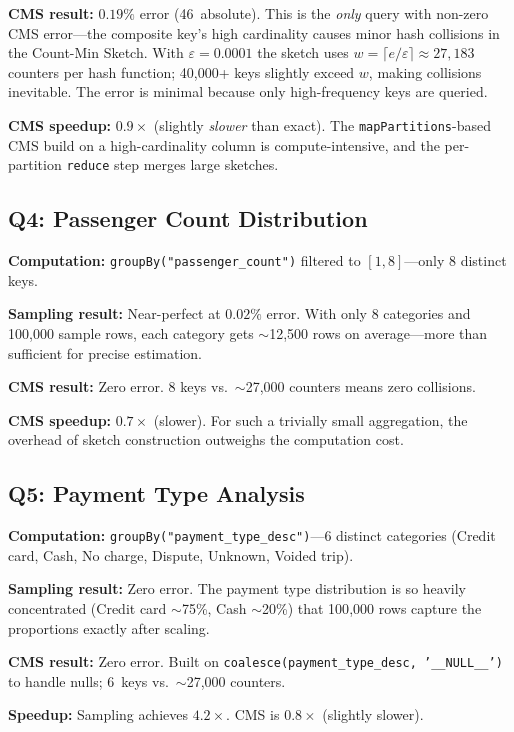 \documentclass{article}
\begin{document}
\textbf{CMS result:} $0.19\%$ error (46~absolute). This is the \emph{only} query with non-zero CMS error—the composite key's high cardinality causes minor hash collisions in the Count-Min Sketch. With $\varepsilon = 0.0001$ the sketch uses $w = \lceil e / \varepsilon \rceil \approx 27{,}183$ counters per hash function; 40{,}000+ keys slightly exceed $w$, making collisions inevitable. The error is minimal because only high-frequency keys are queried.

\textbf{CMS speedup:} $0.9\times$ (slightly \emph{slower} than exact). The \texttt{mapPartitions}-based CMS build on a high-cardinality column is compute-intensive, and the per-partition \texttt{reduce} step merges large sketches.

\subsection{Q4: Passenger Count Distribution}

\textbf{Computation:} \texttt{groupBy("passenger\_count")} filtered to $[1, 8]$—only 8 distinct keys.

\textbf{Sampling result:} Near-perfect at $0.02\%$ error. With only 8 categories and 100{,}000 sample rows, each category gets $\sim$12{,}500 rows on average—more than sufficient for precise estimation.

\textbf{CMS result:} Zero error. 8 keys vs.\ $\sim$27{,}000 counters means zero collisions.

\textbf{CMS speedup:} $0.7\times$ (slower). For such a trivially small aggregation, the overhead of sketch construction outweighs the computation cost.

\subsection{Q5: Payment Type Analysis}

\textbf{Computation:} \texttt{groupBy("payment\_type\_desc")}—6 distinct categories (Credit card, Cash, No charge, Dispute, Unknown, Voided trip).

\textbf{Sampling result:} Zero error. The payment type distribution is so heavily concentrated (Credit card $\sim$75\%, Cash $\sim$20\%) that 100{,}000 rows capture the proportions exactly after scaling.

\textbf{CMS result:} Zero error. Built on \texttt{coalesce(payment\_type\_desc, '\_\_NULL\_\_')} to handle nulls; 6~keys vs.\ $\sim$27{,}000 counters.

\textbf{Speedup:} Sampling achieves $4.2\times$. CMS is $0.8\times$ (slightly slower).
\end{document}
